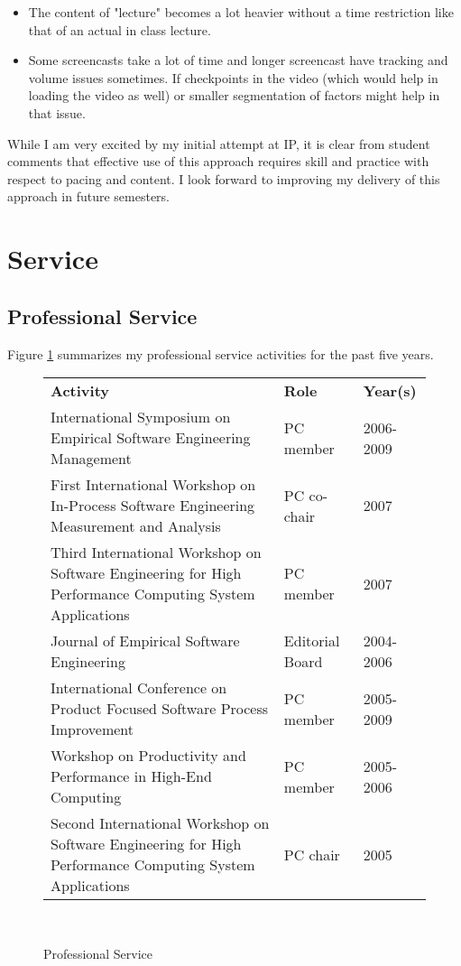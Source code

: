 \documentclass[11pt]{article}
\begin{document}
\begin{itemize}
\item The content of "lecture" becomes a lot heavier without a time
  restriction like that of an actual in class lecture.

\item Some screencasts take a lot of time and longer screencast have
  tracking and volume issues sometimes. If checkpoints in the video (which
  would help in loading the video as well) or smaller segmentation of
  factors might help in that issue.

\end{itemize}

While I am very excited by my initial attempt at IP, it is clear from
student comments that effective use of this approach requires skill and
practice with respect to pacing and content.  I look forward to improving
my delivery of this approach in future semesters. 

\newpage
\section{Service}

\subsection{Professional Service}

Figure \ref{fig:professional-service} summarizes my professional service
activities for the past five years. 

\begin{figure}[!ht]
\small
\begin{tabular}{p{4in}ll} \hline
{\bf Activity} & {\bf Role} & {\bf Year(s)}  \\
International Symposium on Empirical Software  Engineering Management & PC member & 2006-2009 \\
First International Workshop on In-Process Software Engineering Measurement and Analysis & PC co-chair & 2007 \\
Third International Workshop on Software Engineering for High Performance 
Computing System Applications & PC member &  2007\\
Journal of Empirical Software Engineering & Editorial Board & 2004-2006  \\
International Conference on Product Focused
  Software Process Improvement & PC member & 2005-2009 \\
Workshop on Productivity and Performance in High-End Computing & PC member &  2005-2006\\
 Second International Workshop on Software Engineering for High Performance 
Computing System Applications & PC chair &  2005 \\ \hline
\end{tabular} \\ 
\normalsize
\caption{Professional Service}
\label{fig:professional-service}
\end{figure}
\end{document}
